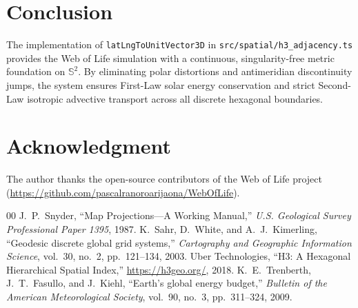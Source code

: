 \documentclass[10pt,journal,compsoc]{IEEEtran}
\begin{document}
\section{Conclusion}
The implementation of \texttt{latLngToUnitVector3D} in \texttt{src/spatial/h3\_adjacency.ts} provides the Web of Life simulation with a continuous, singularity-free metric foundation on $\mathbb{S}^2$. By eliminating polar distortions and antimeridian discontinuity jumps, the system ensures First-Law solar energy conservation and strict Second-Law isotropic advective transport across all discrete hexagonal boundaries.

\section*{Acknowledgment}
The author thanks the open-source contributors of the Web of Life project (\url{https://github.com/pascalranoroarijaona/WebOfLife}).

\begin{thebibliography}{00}
 J.~P.~Snyder, ``Map Projections---A Working Manual,'' \emph{U.S. Geological Survey Professional Paper 1395}, 1987.
 K.~Sahr, D.~White, and A.~J.~Kimerling, ``Geodesic discrete global grid systems,'' \emph{Cartography and Geographic Information Science}, vol.~30, no.~2, pp.~121--134, 2003.
 Uber Technologies, ``H3: A Hexagonal Hierarchical Spatial Index,'' \url{https://h3geo.org/}, 2018.
 K.~E.~Trenberth, J.~T.~Fasullo, and J.~Kiehl, ``Earth's global energy budget,'' \emph{Bulletin of the American Meteorological Society}, vol.~90, no.~3, pp.~311--324, 2009.
\end{thebibliography}
\end{document}
